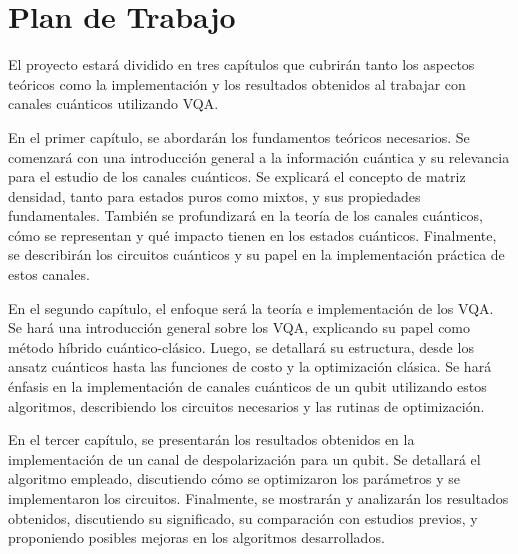 \section{Plan de Trabajo}

El proyecto estará dividido en tres capítulos que cubrirán tanto los aspectos teóricos como la implementación y los resultados obtenidos al trabajar con canales cuánticos utilizando VQA.

En el primer capítulo, se abordarán los fundamentos teóricos necesarios. Se comenzará con una introducción general a la información cuántica y su relevancia para el estudio de los canales cuánticos. Se explicará el concepto de matriz densidad, tanto para estados puros como mixtos, y sus propiedades fundamentales. También se profundizará en la teoría de los canales cuánticos, cómo se representan y qué impacto tienen en los estados cuánticos. Finalmente, se describirán los circuitos cuánticos y su papel en la implementación práctica de estos canales.

En el segundo capítulo, el enfoque será la teoría e implementación de los VQA. Se hará una introducción general sobre los VQA, explicando su papel como método híbrido cuántico-clásico. Luego, se detallará su estructura, desde los ansatz cuánticos hasta las funciones de costo y la optimización clásica. Se hará énfasis en la implementación de canales cuánticos de un qubit utilizando estos algoritmos, describiendo los circuitos necesarios y las rutinas de optimización.

En el tercer capítulo, se presentarán los resultados obtenidos en la implementación de un canal de despolarización para un qubit. Se detallará el algoritmo empleado, discutiendo cómo se optimizaron los parámetros y se implementaron los circuitos. Finalmente, se mostrarán y analizarán los resultados obtenidos, discutiendo su significado, su comparación con estudios previos, y proponiendo posibles mejoras en los algoritmos desarrollados.

